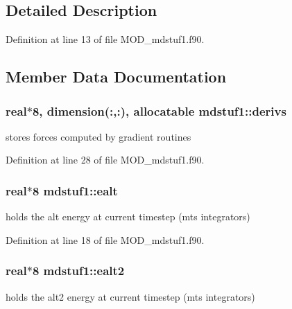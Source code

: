 \subsection{Detailed Description}


Definition at line 13 of file M\-O\-D\-\_\-mdstuf1.\-f90.



\subsection{Member Data Documentation}
\hypertarget{classmdstuf1_a51707f5cb35150bb27d8d2e190a78dd8}{
\subsubsection[{derivs}]{\setlength{\rightskip}{0pt plus 5cm}real$\ast$8, dimension(\-:,\-:), allocatable mdstuf1\-::derivs}}\label{classmdstuf1_a51707f5cb35150bb27d8d2e190a78dd8}


stores forces computed by gradient routines 



Definition at line 28 of file M\-O\-D\-\_\-mdstuf1.\-f90.

\hypertarget{classmdstuf1_a016dbac1751502a1040045a7e90f1e22}{
\subsubsection[{ealt}]{\setlength{\rightskip}{0pt plus 5cm}real$\ast$8 mdstuf1\-::ealt}}\label{classmdstuf1_a016dbac1751502a1040045a7e90f1e22}


holds the alt energy at current timestep (mts integrators) 



Definition at line 18 of file M\-O\-D\-\_\-mdstuf1.\-f90.

\hypertarget{classmdstuf1_aa6bfc0bf5d1a33a2745ba6eb8b193eb7}{
\subsubsection[{ealt2}]{\setlength{\rightskip}{0pt plus 5cm}real$\ast$8 mdstuf1\-::ealt2}}\label{classmdstuf1_aa6bfc0bf5d1a33a2745ba6eb8b193eb7}


holds the alt2 energy at current timestep (mts integrators) 



